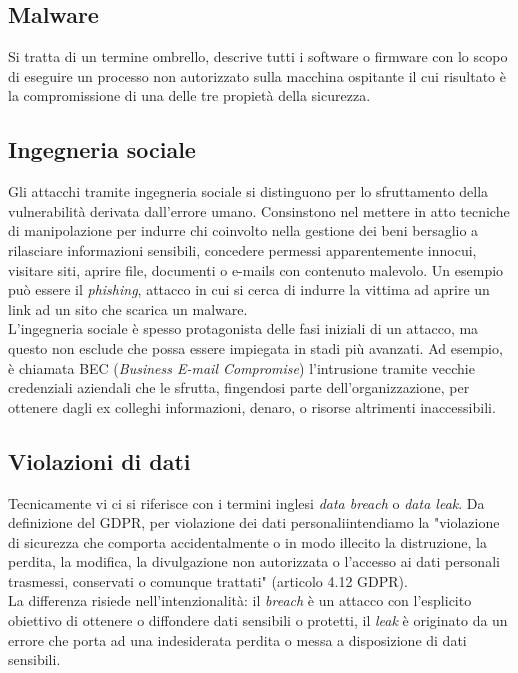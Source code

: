 \documentclass[12pt,a4paper,openright,twoside]{report}
\begin{document}
\subsection{Malware}
Si tratta di un termine ombrello, descrive tutti i software o firmware con lo scopo di eseguire un processo non autorizzato sulla macchina ospitante il cui risultato \`e la compromissione di una delle tre propiet\`a della sicurezza.\\
\subsection{Ingegneria sociale}
Gli attacchi tramite ingegneria sociale si distinguono per lo sfruttamento della vulnerabilit\`a derivata dall'errore umano. Consinstono nel mettere in atto tecniche di manipolazione per indurre chi coinvolto nella gestione dei beni bersaglio a rilasciare informazioni sensibili, concedere permessi 
apparentemente innocui, visitare siti, aprire file, documenti o e-mails con contenuto malevolo. Un esempio pu\`o essere il \textit{phishing}, attacco in cui si cerca di indurre la vittima ad aprire un link ad un sito che scarica un malware.\\
L'ingegneria sociale \`e spesso protagonista delle fasi iniziali di un attacco, ma questo non esclude che possa essere impiegata in stadi pi\`u avanzati. Ad esempio, \`e chiamata BEC (\textit{Business E-mail Compromise}) l'intrusione tramite vecchie credenziali aziendali che le sfrutta, fingendosi parte dell'organizzazione, per ottenere dagli ex colleghi informazioni, denaro, o risorse altrimenti inaccessibili.\cite{IBM_BEC}\\

\subsection{Violazioni di dati}
Tecnicamente vi ci si riferisce con i termini inglesi \textit{data breach} o \textit{data leak}.  
Da definizione del GDPR, per violazione dei dati personaliintendiamo la "violazione di sicurezza che comporta accidentalmente o in modo illecito la distruzione, la perdita, la modifica, la divulgazione non autorizzata o l'accesso ai dati personali trasmessi, conservati o comunque trattati" (articolo 4.12 GDPR). \\
La differenza risiede nell'intenzionalità: il \textit{breach} \`e un attacco con l'esplicito obiettivo di ottenere o diffondere dati sensibili o protetti, il \textit{leak} è originato da un errore che porta ad una indesiderata perdita o messa a disposizione di dati sensibili. \\
\end{document}
